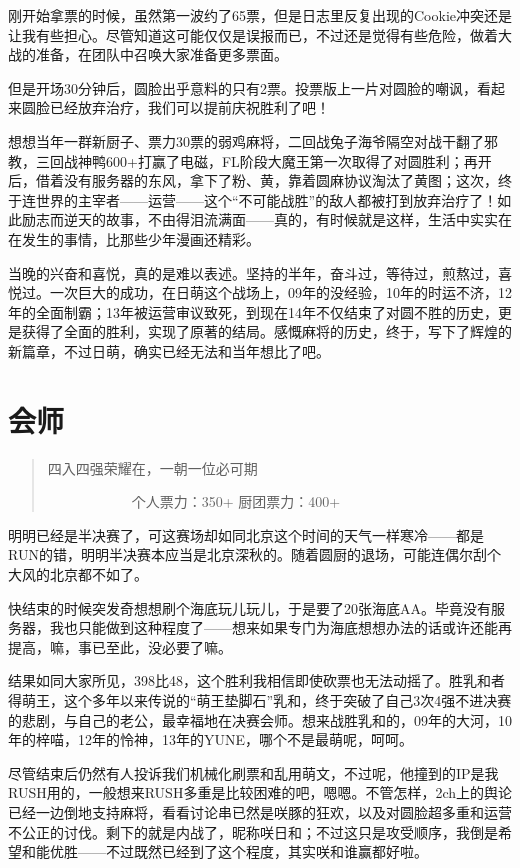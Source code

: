 刚开始拿票的时候，虽然第一波约了65票，但是日志里反复出现的Cookie冲突还是让我有些担心。尽管知道这可能仅仅是误报而已，不过还是觉得有些危险，做着大战的准备，在团队中召唤大家准备更多票面。

但是开场30分钟后，圆脸出乎意料的只有2票。投票版上一片对圆脸的嘲讽，看起来圆脸已经放弃治疗，我们可以提前庆祝胜利了吧！

想想当年一群新厨子、票力30票的弱鸡麻将，二回战兔子海爷隔空对战干翻了邪教，三回战神鸭600+打赢了电磁，FL阶段大魔王第一次取得了对圆胜利；再开后，借着没有服务器的东风，拿下了粉、黄，靠着圆麻协议淘汰了黄图；这次，终于连世界的主宰者——运营——这个“不可能战胜”的敌人都被打到放弃治疗了！如此励志而逆天的故事，不由得泪流满面——真的，有时候就是这样，生活中实实在在发生的事情，比那些少年漫画还精彩。

当晚的兴奋和喜悦，真的是难以表述。坚持的半年，奋斗过，等待过，煎熬过，喜悦过。一次巨大的成功，在日萌这个战场上，09年的没经验，10年的时运不济，12年的全面制霸；13年被运营审议致死，到现在14年不仅结束了对圆不胜的历史，更是获得了全面的胜利，实现了原著的结局。感慨麻将的历史，终于，写下了辉煌的新篇章，不过日萌，确实已经无法和当年想比了吧。


\chapter{会师}
\begin{quote}
四入四强荣耀在，一朝一位必可期

　　　　　　个人票力：350+ 厨团票力：400+
\end{quote}

明明已经是半决赛了，可这赛场却如同北京这个时间的天气一样寒冷——都是RUN的错，明明半决赛本应当是北京深秋的。随着圆厨的退场，可能连偶尔刮个大风的北京都不如了。

快结束的时候突发奇想想刷个海底玩儿玩儿，于是要了20张海底AA。毕竟没有服务器，我也只能做到这种程度了——想来如果专门为海底想想办法的话或许还能再提高，嘛，事已至此，没必要了嘛。

结果如同大家所见，398比48，这个胜利我相信即使砍票也无法动摇了。胜乳和者得萌王，这个多年以来传说的“萌王垫脚石”乳和，终于突破了自己3次4强不进决赛的悲剧，与自己的老公，最幸福地在决赛会师。想来战胜乳和的，09年的大河，10年的梓喵，12年的怜神，13年的YUNE，哪个不是最萌呢，呵呵。

尽管结束后仍然有人投诉我们机械化刷票和乱用萌文，不过呢，他撞到的IP是我RUSH用的，一般想来RUSH多重是比较困难的吧，嗯嗯。不管怎样，2ch上的舆论已经一边倒地支持麻将，看看讨论串已然是咲豚的狂欢，以及对圆脸超多重和运营不公正的讨伐。剩下的就是内战了，昵称咲日和；不过这只是攻受顺序，我倒是希望和能优胜——不过既然已经到了这个程度，其实咲和谁赢都好啦。

